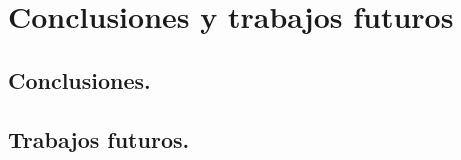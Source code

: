\chapter{Conclusiones y trabajos futuros}

\section{Conclusiones.}

%



\section{Trabajos futuros.}

